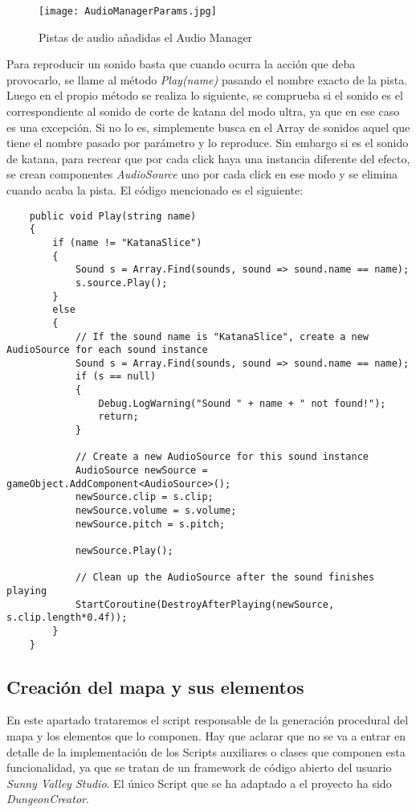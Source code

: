 \begin{figure}[H]
    \centering
    \texttt{[image: AudioManagerParams.jpg]}
    \caption{Pistas de audio añadidas el Audio Manager}
\end{figure}

Para reproducir un sonido basta que cuando ocurra la acción que deba provocarlo, se llame al método \textit{Play(name)} pasando el nombre exacto de la pista. Luego en el propio método se realiza lo siguiente, se comprueba si el sonido es el correspondiente al sonido de corte de katana del modo ultra, ya que en ese caso es una excepción. Si no lo es, simplemente busca en el Array de sonidos aquel que tiene el nombre pasado por parámetro y lo reproduce. Sin embargo si es el sonido de katana, para recrear que por cada click haya una instancia diferente del efecto, se crean componentes \textit{AudioSource} uno por cada click en ese modo y se elimina cuando acaba la pista. El código mencionado es el siguiente: 

\begin{lstlisting}
    public void Play(string name)
    {
        if (name != "KatanaSlice")
        {
            Sound s = Array.Find(sounds, sound => sound.name == name);
            s.source.Play();
        }
        else
        {
            // If the sound name is "KatanaSlice", create a new AudioSource for each sound instance
            Sound s = Array.Find(sounds, sound => sound.name == name);
            if (s == null)
            {
                Debug.LogWarning("Sound " + name + " not found!");
                return;
            }

            // Create a new AudioSource for this sound instance
            AudioSource newSource = gameObject.AddComponent<AudioSource>();
            newSource.clip = s.clip;
            newSource.volume = s.volume;
            newSource.pitch = s.pitch;

            newSource.Play();

            // Clean up the AudioSource after the sound finishes playing
            StartCoroutine(DestroyAfterPlaying(newSource, s.clip.length*0.4f));
        }
    }
\end{lstlisting}

\subsection{Creación del mapa y sus elementos}

En este apartado trataremos el script responsable de la generación procedural del mapa y los elementos que lo componen. Hay que aclarar que no se va a entrar en detalle de la implementación de los Scripts auxiliares o clases que componen esta funcionalidad, ya que se tratan de un framework de código abierto del usuario \textit{Sunny Valley Studio}. El único Script que se ha adaptado a el proyecto ha sido \textit{DungeonCreator}.

